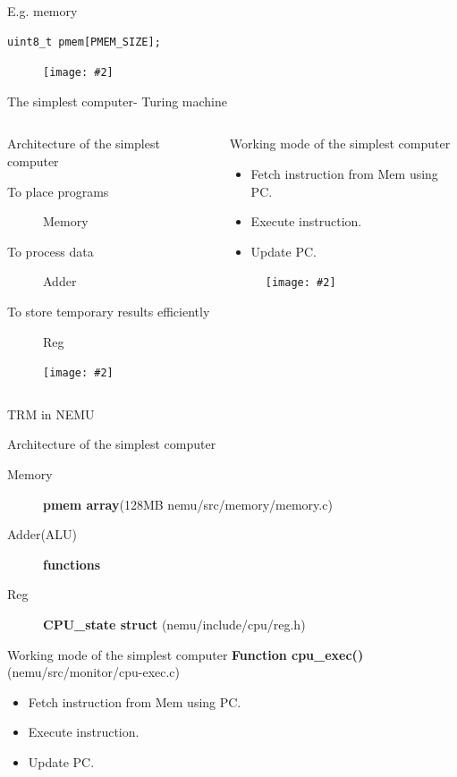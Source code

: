 \documentclass{beamer}
\newcommand{\fignocaption}[2]{
	\begin{figure}[htp]
		\centering
		\texttt{[image: \#2]}
	\end{figure}
}
\begin{document}
\begin{frame}[fragile]{E.g. memory}
\begin{verbatim}
uint8_t pmem[PMEM_SIZE];
\end{verbatim}
	\fignocaption{scale=0.2}{memory.jpg}
\end{frame}

\begin{frame}{The simplest computer- Turing machine}
	\begin{columns}
		\begin{column}{0.5\textwidth}
			\begin{block}{Architecture of the simplest computer }
					\begin{description}
					\item[To place programs] Memory
					\item[To process data]Adder
					\item[To store temporary results efficiently]Reg
				\end{description}
			\end{block}
			\fignocaption{scale=0.4}{trm.png}

		\end{column}
		\begin{column}{0.5\textwidth}
				\begin{block}{Working mode of the simplest computer}
				\begin{itemize}
					\item Fetch instruction from Mem using PC.
					\item Execute instruction.
					\item Update PC.
				\end{itemize}
			\end{block}
			\fignocaption{scale=0.5}{tapemachine.jpg}
	\end{column}
	\end{columns}
\end{frame}


\begin{frame}{TRM in NEMU}
		\begin{block}{Architecture of the simplest computer }
			\begin{description}
				\item[Memory] \textbf{pmem array}(128MB nemu/src/memory/memory.c)
				\item[Adder(ALU)] \textbf{functions}
				\item[Reg]	\textbf{CPU\_state struct} (nemu/include/cpu/reg.h)
			\end{description}
		\end{block}
		\begin{block}{Working mode of the simplest computer}
			\textbf{Function cpu\_exec() }(nemu/src/monitor/cpu-exec.c)
			\begin{itemize}
				\item Fetch instruction from Mem using PC.
				\item Execute instruction.
				\item Update PC.
			\end{itemize}
		\end{block}
\end{frame}
\end{document}
